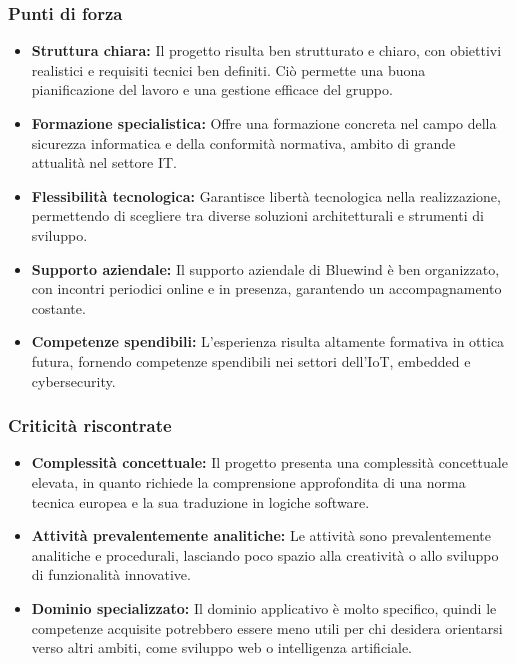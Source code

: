 \documentclass{article}
\begin{document}
	\subsubsection{Punti di forza}
	\begin{itemize}
		\item \textbf{Struttura chiara:} Il progetto risulta ben strutturato e chiaro, con obiettivi realistici e requisiti tecnici ben definiti. Ciò permette una buona pianificazione del lavoro e una gestione efficace del gruppo.
		\item \textbf{Formazione specialistica:} Offre una formazione concreta nel campo della sicurezza informatica e della conformità normativa, ambito di grande attualità nel settore IT.
        \item \textbf{Flessibilità tecnologica:} Garantisce libertà tecnologica nella realizzazione, permettendo di scegliere tra diverse soluzioni architetturali e strumenti di sviluppo.
        \item \textbf{Supporto aziendale:} Il supporto aziendale di Bluewind è ben organizzato, con incontri periodici online e in presenza, garantendo un accompagnamento costante.
		\item \textbf{Competenze spendibili:} L'esperienza risulta altamente formativa in ottica futura, fornendo competenze spendibili nei settori dell'IoT, embedded e cybersecurity.
	\end{itemize}
	
	\subsubsection{Criticità riscontrate}
	\begin{itemize}
		\item \textbf{Complessità concettuale:} Il progetto presenta una complessità concettuale elevata, in quanto richiede la comprensione approfondita di una norma tecnica europea e la sua traduzione in logiche software.
		\item \textbf{Attività prevalentemente analitiche:} Le attività sono prevalentemente analitiche e procedurali, lasciando poco spazio alla creatività o allo sviluppo di funzionalità innovative.
		\item \textbf{Dominio specializzato:} Il dominio applicativo è molto specifico, quindi le competenze acquisite potrebbero essere meno utili per chi desidera orientarsi verso altri ambiti, come sviluppo web o intelligenza artificiale.
	\end{itemize}
	
\end{document}

